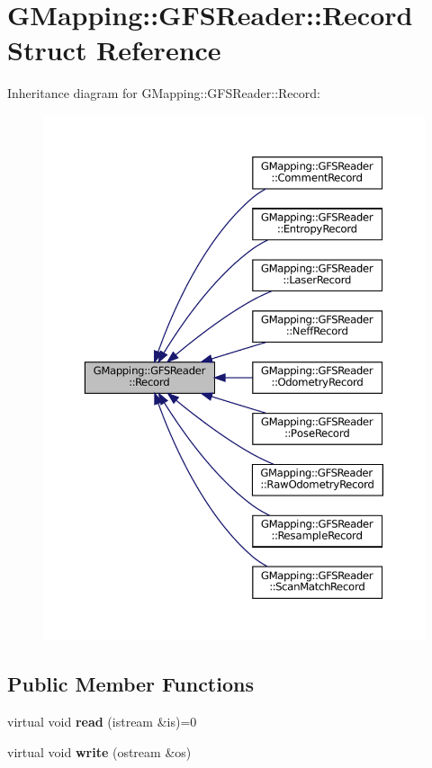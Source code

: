 \hypertarget{structGMapping_1_1GFSReader_1_1Record}{}\section{G\+Mapping\+:\+:G\+F\+S\+Reader\+:\+:Record Struct Reference}
\label{structGMapping_1_1GFSReader_1_1Record}


Inheritance diagram for G\+Mapping\+:\+:G\+F\+S\+Reader\+:\+:Record\+:
\nopagebreak
\begin{figure}[H]
\begin{center}
\leavevmode
\includegraphics[width=350pt]{structGMapping_1_1GFSReader_1_1Record__inherit__graph}
\end{center}
\end{figure}
\subsection*{Public Member Functions}
\begin{DoxyCompactItemize}
\item 
\mbox{\label{structGMapping_1_1GFSReader_1_1Record_a29b4165c8a00becafa59586e2638d21f}} 
virtual void {\bfseries read} (istream \&is)=0
\item 
\mbox{\label{structGMapping_1_1GFSReader_1_1Record_a2d9ae26f1f6db0a1101ed537a19add14}} 
virtual void {\bfseries write} (ostream \&os)
\end{DoxyCompactItemize}
